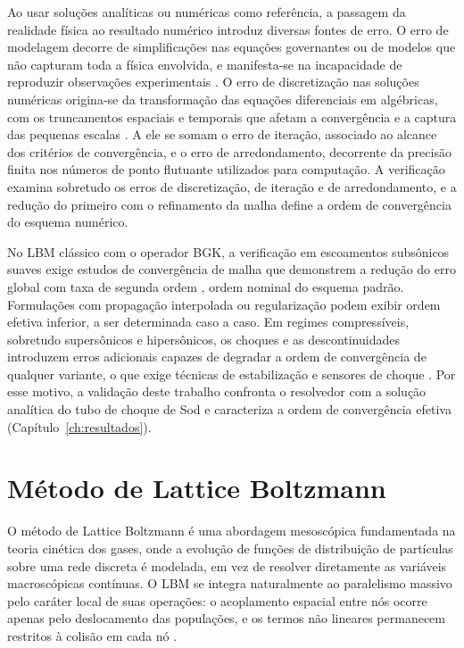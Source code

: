 Ao usar soluções analíticas ou numéricas como referência, a passagem da realidade física ao resultado numérico introduz diversas fontes de erro.
O erro de modelagem decorre de simplificações nas equações governantes ou de modelos que não capturam toda a física envolvida, e manifesta-se na incapacidade de reproduzir observações experimentais \parencite{AIAA1998}.
O erro de discretização nas soluções numéricas origina-se da transformação das equações diferenciais em algébricas, com os truncamentos espaciais e temporais que afetam a convergência e a captura das pequenas escalas \parencite{Roache1998}.
A ele se somam o erro de iteração, associado ao alcance dos critérios de convergência, e o erro de arredondamento, decorrente da precisão finita nos números de ponto flutuante utilizados para computação.
A verificação examina sobretudo os erros de discretização, de iteração e de arredondamento, e a redução do primeiro com o refinamento da malha define a ordem de convergência do esquema numérico.

No LBM clássico com o operador BGK, a verificação em escoamentos subsônicos suaves exige estudos de convergência de malha que demonstrem a redução do erro global com taxa de segunda ordem \parencite{Rathnayake2024, Succi2001}, ordem nominal do esquema padrão.
Formulações com propagação interpolada ou regularização podem exibir ordem efetiva inferior, a ser determinada caso a caso.
Em regimes compressíveis, sobretudo supersônicos e hipersônicos, os choques e as descontinuidades introduzem erros adicionais capazes de degradar a ordem de convergência de qualquer variante, o que exige técnicas de estabilização e sensores de choque \parencite{Tran2022, Qiu2020, Guo2020}.
Por esse motivo, a validação deste trabalho confronta o resolvedor com a solução analítica do tubo de choque de Sod e caracteriza a ordem de convergência efetiva (Capítulo~\ref{ch:resultados}).


\section{Método de Lattice Boltzmann}\label{sec:metodo-de-lattice-boltzmann}

O método de Lattice Boltzmann é uma abordagem mesoscópica fundamentada na teoria cinética dos gases, onde a evolução de funções de distribuição de partículas sobre uma rede discreta é modelada, em vez de resolver diretamente as variáveis macroscópicas contínuas.
O LBM se integra naturalmente ao paralelismo massivo pelo caráter local de suas operações: o acoplamento espacial entre nós ocorre apenas pelo deslocamento das populações, e os termos não lineares permanecem restritos à colisão em cada nó \parencite{Chen1998, Succi2001, WolfGladrow2000}.

